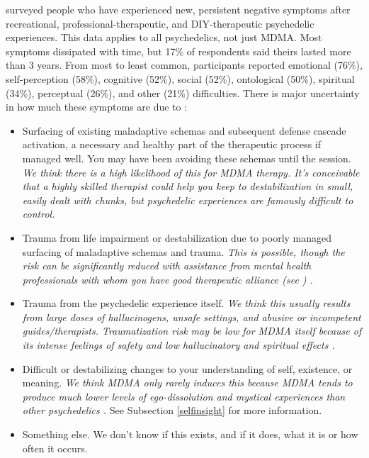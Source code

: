 \documentclass[12pt,letterpaper]{book}
\begin{document}
\textcite{evans2023extended} surveyed people who have experienced new, persistent negative symptoms after recreational, professional-therapeutic, and DIY-therapeutic psychedelic experiences. This data applies to all psychedelics, not just MDMA. Most symptoms dissipated with time, but 17\% of respondents said theirs lasted more than 3 years. From most to least common, participants reported emotional (76\%), self-perception (58\%), cognitive (52\%), social (52\%), ontological (50\%), spiritual (34\%), perceptual (26\%), and other (21\%) difficulties. There is major uncertainty in how much these symptoms are due to \cite{calder2025traumatic}:
\begin{itemize}
	\item Surfacing of existing maladaptive schemas and subsequent defense cascade activation, a necessary and healthy part of the therapeutic process if managed well. You may have been avoiding these schemas until the session. \textit{We think there is a high likelihood of this for MDMA therapy. It's conceivable that a highly skilled therapist could help you keep to destabilization in small, easily dealt with chunks, but psychedelic experiences are famously difficult to control.}
	\item Trauma from life impairment or destabilization due to poorly managed surfacing of maladaptive schemas and trauma. \textit{This is possible, though the risk can be significantly reduced with assistance from mental health professionals with whom you have good therapeutic alliance (see \textcite{BRWAIdownload}) \cite{fluckiger2018alliance}.}
	\item Trauma from the psychedelic experience itself. \textit{We think this usually results from large doses of hallucinogens, unsafe settings, and abusive or incompetent guides/therapists. Traumatization risk may be low for MDMA itself because of its intense feelings of safety and low hallucinatory and spiritual effects \cite{studerus2010psychometric}.}
	\item Difficult or destabilizing changes to your understanding of self, existence, or meaning. \textit{We think MDMA only rarely induces this because MDMA tends to produce much lower levels of ego-dissolution and mystical experiences than other psychedelics \cite{mdmaExtendedEvans,holze2020distinct}.} See Subsection \ref{selfinsight} for more information.
	\item Something else. We don't know if this exists, and if it does, what it is or how often it occurs.
\end{itemize}
\end{document}
